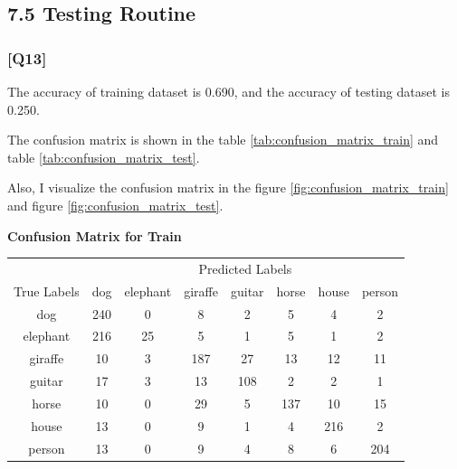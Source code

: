 \documentclass{article}
\begin{document}
\subsection*{7.5 Testing Routine}

\subsubsection*{[Q13]}

The accuracy of training dataset is 0.690, and the accuracy of testing dataset is 0.250.

The confusion matrix is shown in the table \ref{tab:confusion_matrix_train} and table \ref{tab:confusion_matrix_test}.

Also, I visualize the confusion matrix in the figure \ref{fig:confusion_matrix_train} and figure \ref{fig:confusion_matrix_test}.

\begin{center}
    \textbf{Confusion Matrix for Train}
    
    \begin{tabular}{c|ccccccc}
    \toprule
    & \multicolumn{7}{c}{Predicted Labels} \\
    \cmidrule(lr){2-8}
    True Labels & dog & elephant & giraffe & guitar & horse & house & person \\
    \midrule
    dog & 240 & 0 & 8 & 2 & 5 & 4 & 2 \\
    elephant & 216 & 25 & 5 & 1 & 5 & 1 & 2 \\
    giraffe & 10 & 3 & 187 & 27 & 13 & 12 & 11 \\
    guitar & 17 & 3 & 13 & 108 & 2 & 2 & 1 \\
    horse & 10 & 0 & 29 & 5 & 137 & 10 & 15 \\
    house & 13 & 0 & 9 & 1 & 4 & 216 & 2 \\
    person & 13 & 0 & 9 & 4 & 8 & 6 & 204 \\
    \bottomrule
    \end{tabular}
    \label{tab:confusion_matrix_train}
\end{center}

    
    
\end{document}
